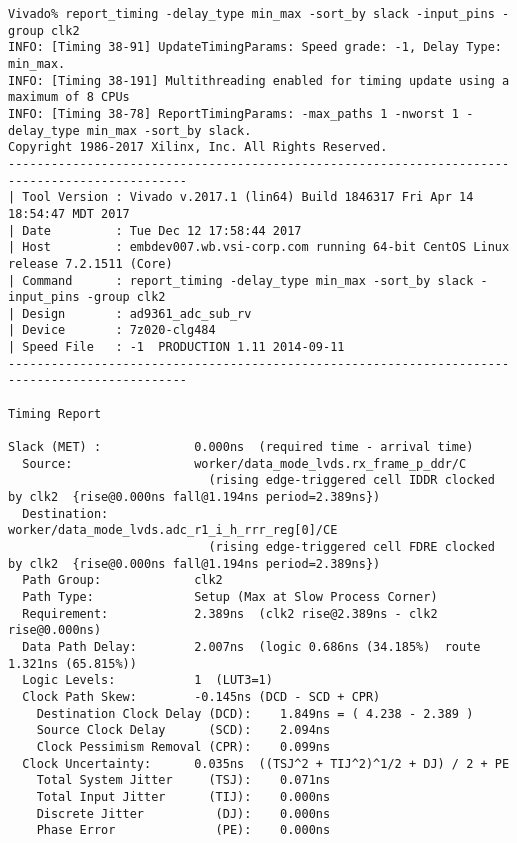 \documentclass{article}
\begin{document}
\begin{lstlisting}
Vivado% report_timing -delay_type min_max -sort_by slack -input_pins -group clk2
INFO: [Timing 38-91] UpdateTimingParams: Speed grade: -1, Delay Type: min_max.
INFO: [Timing 38-191] Multithreading enabled for timing update using a maximum of 8 CPUs
INFO: [Timing 38-78] ReportTimingParams: -max_paths 1 -nworst 1 -delay_type min_max -sort_by slack.
Copyright 1986-2017 Xilinx, Inc. All Rights Reserved.
-----------------------------------------------------------------------------------------------
| Tool Version : Vivado v.2017.1 (lin64) Build 1846317 Fri Apr 14 18:54:47 MDT 2017
| Date         : Tue Dec 12 17:58:44 2017
| Host         : embdev007.wb.vsi-corp.com running 64-bit CentOS Linux release 7.2.1511 (Core)
| Command      : report_timing -delay_type min_max -sort_by slack -input_pins -group clk2
| Design       : ad9361_adc_sub_rv
| Device       : 7z020-clg484
| Speed File   : -1  PRODUCTION 1.11 2014-09-11
-----------------------------------------------------------------------------------------------

Timing Report

Slack (MET) :             0.000ns  (required time - arrival time)
  Source:                 worker/data_mode_lvds.rx_frame_p_ddr/C
                            (rising edge-triggered cell IDDR clocked by clk2  {rise@0.000ns fall@1.194ns period=2.389ns})
  Destination:            worker/data_mode_lvds.adc_r1_i_h_rrr_reg[0]/CE
                            (rising edge-triggered cell FDRE clocked by clk2  {rise@0.000ns fall@1.194ns period=2.389ns})
  Path Group:             clk2
  Path Type:              Setup (Max at Slow Process Corner)
  Requirement:            2.389ns  (clk2 rise@2.389ns - clk2 rise@0.000ns)
  Data Path Delay:        2.007ns  (logic 0.686ns (34.185%)  route 1.321ns (65.815%))
  Logic Levels:           1  (LUT3=1)
  Clock Path Skew:        -0.145ns (DCD - SCD + CPR)
    Destination Clock Delay (DCD):    1.849ns = ( 4.238 - 2.389 ) 
    Source Clock Delay      (SCD):    2.094ns
    Clock Pessimism Removal (CPR):    0.099ns
  Clock Uncertainty:      0.035ns  ((TSJ^2 + TIJ^2)^1/2 + DJ) / 2 + PE
    Total System Jitter     (TSJ):    0.071ns
    Total Input Jitter      (TIJ):    0.000ns
    Discrete Jitter          (DJ):    0.000ns
    Phase Error              (PE):    0.000ns


\end{lstlisting}
\end{document}
